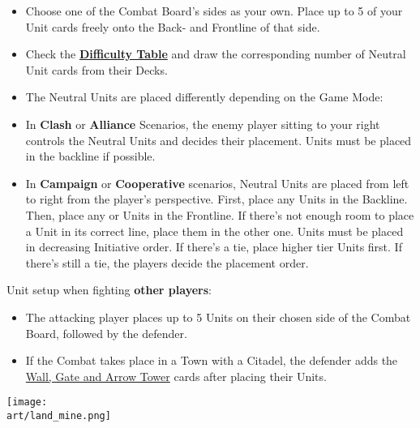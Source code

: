 \begin{multicols}{2}
\begin{itemize}
  \item Choose one of the Combat Board's sides as your own.
    Place up to 5 of your Unit cards freely onto the Back- and Frontline of that side.
  \item Check the \hyperlink{Difficulty}{\textbf{Difficulty Table}} and draw the corresponding number of Neutral Unit cards from their Decks.
  \item The Neutral Units are placed differently depending on the Game Mode:
  \item In \textbf{Clash} or \textbf{Alliance} Scenarios, the enemy player sitting to your right controls the Neutral Units and decides their placement.
     Units must be placed in the backline if possible.
  \item In \textbf{Campaign} or \textbf{Cooperative} scenarios, Neutral Units are placed from left to right from the player's perspective.
First, place any  Units in the Backline.
Then, place any  or  Units in the Frontline.
If there's not enough room to place a Unit in its correct line, place them in the other one.
Units must be placed in decreasing Initiative order.
If there's a tie, place higher tier Units first.
If there's still a tie, the players decide the placement order.
\end{itemize}
Unit setup when fighting \textbf{other players}:
\begin{itemize}[wide]
  \item The attacking player places up to 5 Units on their chosen side of the Combat Board, followed by the defender.
  \item If the Combat takes place in a Town with a Citadel, the defender adds the \hyperlink{Walls}{Wall, Gate and Arrow Tower} cards after placing their Units.
\end{itemize}


\begin{center}
    \texttt{[image: \\art/land\_mine.png]}
\end{center}


\end{multicols}
